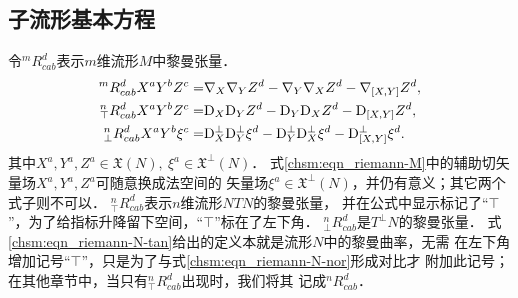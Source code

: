 \subsection{子流形基本方程}
令${}^{m}R^d_{cab}$表示$m$维流形$M$中黎曼张量．
\begin{subequations}\label{chsm:eqn_riemann-MN-TN}
\begin{align}
    {}^{m}R^d_{cab}X^aY^bZ^c=& {\nabla}_X {\nabla}_Y Z^d -{\nabla}_Y {\nabla}_X Z^d
       - {\nabla}_{[X,Y]} Z^d , \label{chsm:eqn_riemann-M} \\
    {}^{n}_{\top}R^d_{cab}X^aY^bZ^c=& {\rm D}_X {\rm D}_Y Z^d -{\rm D}_Y {\rm D}_X Z^d
       - {\rm D}_{[X,Y]} Z^d, \label{chsm:eqn_riemann-N-tan} \\
    {}^{n}_{\bot}R^d_{cab}X^aY^b \xi^c=& {\rm D}_X^\bot {\rm D}^\bot_Y \xi^d -{\rm D}^\bot_Y {\rm D}^\bot_X \xi^d
       - {\rm D}^\bot_{[X,Y]} \xi^d. \label{chsm:eqn_riemann-N-nor}
\end{align}
\end{subequations}
其中$X^a,Y^a,Z^a\in \mathfrak{X}(N), \ \xi^a \in \mathfrak{X}^\bot (N)$．
式\eqref{chsm:eqn_riemann-M}中的辅助切矢量场$X^a,Y^a,Z^a$可随意换成法空间的
矢量场$\xi^a\in \mathfrak{X}^\bot(N)$，并仍有意义；其它两个式子则不可以．
${}^{n}_{\top}R^d_{cab}$表示$n$维流形$N$$T N$的黎曼张量，
并在公式中显示标记了“$\top$”，为了给指标升降留下空间，“$\top$”标在了左下角．
${}^{n}_{\bot}R^d_{cab}$是$T^\bot N$的黎曼张量．
式\eqref{chsm:eqn_riemann-N-tan}给出的定义本就是流形$N$中的黎曼曲率，无需
在左下角增加记号“$\top$”，只是为了与式\eqref{chsm:eqn_riemann-N-nor}形成对比才
附加此记号；在其他章节中，当只有${}^{n}_{\top}R^d_{cab}$出现时，我们将其
记成${}^{n}R^d_{cab}$．

